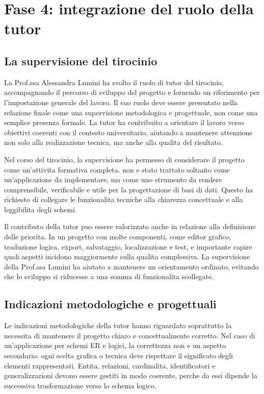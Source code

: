 
\chapter{Fase 4: integrazione del ruolo della tutor}

\section{La supervisione del tirocinio}

La Prof.ssa Alessandra Lumini ha svolto il ruolo di tutor del tirocinio, accompagnando il percorso di sviluppo del progetto \builder{} e fornendo un riferimento per l'impostazione generale del lavoro. Il suo ruolo deve essere presentato nella relazione finale come una supervisione metodologica e progettuale, non come una semplice presenza formale. La tutor ha contribuito a orientare il lavoro verso obiettivi coerenti con il contesto universitario, aiutando a mantenere attenzione non solo alla realizzazione tecnica, ma anche alla qualita del risultato.

Nel corso del tirocinio, la supervisione ha permesso di considerare il progetto come un'attivita formativa completa. \builder{} non e stato trattato soltanto come un'applicazione da implementare, ma come uno strumento da rendere comprensibile, verificabile e utile per la progettazione di basi di dati. Questo ha richiesto di collegare le funzionalita tecniche alla chiarezza concettuale e alla leggibilita degli schemi.

Il contributo della tutor puo essere valorizzato anche in relazione alla definizione delle priorita. In un progetto con molte componenti, come editor grafico, traduzione logica, export, salvataggio, localizzazione e test, e importante capire quali aspetti incidono maggiormente sulla qualita complessiva. La supervisione della Prof.ssa Lumini ha aiutato a mantenere un orientamento ordinato, evitando che lo sviluppo si riducesse a una somma di funzionalita scollegate.

\section{Indicazioni metodologiche e progettuali}

Le indicazioni metodologiche della tutor hanno riguardato soprattutto la necessita di mantenere il progetto chiaro e concettualmente corretto. Nel caso di un'applicazione per schemi ER e logici, la correttezza non e un aspetto secondario: ogni scelta grafica o tecnica deve rispettare il significato degli elementi rappresentati. Entita, relazioni, cardinalita, identificatori e generalizzazioni devono essere gestiti in modo coerente, perche da essi dipende la successiva trasformazione verso lo schema logico.

